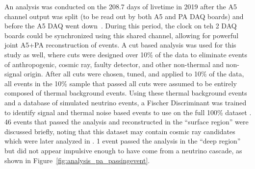   An analysis was conducted on the 208.7 days of livetime in 2019 after the A5 channel output was split (to be read out by both A5 and PA DAQ boards) and before the A5 DAQ went down~\citep{ara_pa_analysis}.
  During this period, the clock on teh 2 DAQ boards could be synchronized using this shared channel, allowing for powerful joint A5+PA reconstruction of events. 
  A cut based analysis was used for this study as well, where cuts were designed over 10\% of the data to eliminate events of anthropogenic, cosmic ray, faulty detector, and other non-thermal and non-signal origin.
  After all cuts were chosen, tuned, and applied to 10\% of the data, all events in the 10\% sample that passed all cuts were assumed to be entirely composed of thermal background events. 
  Using these thermal background events and a database of simulated neutrino events, a Fischer Discriminant was trained to identify signal and thermal noise based events to use on the full 100\% dataset \citep{fisherDiscriminant}.
  46 events that passed the analysis and reconstructed in the ``surface region'' were discussed briefly, noting that this dataset may contain cosmic ray candidates which were later analyzed in \citep{ara_cr}.
  1 event passed the analysis in the ``deep region'' but did not appear impulsive enough to have come from a neutrino cascade, as shown in Figure~\ref{fig:analysis_pa_passingevent}.


